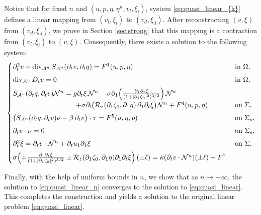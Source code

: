 \documentclass[letterpaper,reqno,10pt,twoside]{amsart}
\theoremstyle{definition}
\theoremstyle{remark}
\def\p{\partial}
\begin{document}
	Notice that for fixed $n$ and $(u,p,\eta,\eta^{n},v_{l},\xi_{l})$, system \eqref{eq:quasi_linear_{k}} defines a linear mapping from $(v_{l},\xi_{l})$ to $(v_{d},\xi_{d})$. After reconstructing $(v,\xi)$ from $(v_{d},\xi_{d})$, we prove in Section \ref{sec:strong} that this mapping is a contraction from $(v_{l},\xi_{l})$ to $(v,\xi)$. Consequently, there exists a solution to the following system:
	\begin{equation}{\label{eq:quasi_linear_n}}
		\begin{cases}
			\partial_{t}^{2}v
			+\operatorname{div}_{\mathcal{A}^{n}}
			S_{\mathcal{A}^{n}}(\partial_{t}v,\partial_{t}q)
			=F^{1}(u,p,\eta)
			& \text{in } \Omega, \\[0.4em]
			\operatorname{div}_{\mathcal{A}^{n}}D_{t}v=0
			& \text{in } \Omega, \\[0.4em]
			S_{\mathcal{A}^{n}}(\partial_{t}q,\partial_{t}v)\mathcal{N}^{n}
			= g\partial_{t}\xi\,\mathcal{N}^{n}
			-\sigma\partial_{1}\!\left(
			\frac{\p_1\p_t\xi}{(1+\vert \partial_{1}\zeta_{0}\vert^{2})^{3/2}}
			\right)\mathcal{N}^{n} \\[0.2em]
			\qquad  \quad\quad\quad\quad\quad\quad\quad
			+\sigma\partial_{1}\!\bigl(
			\mathcal{R}_{z}(\partial_{1}\zeta_{0},\partial_{1}\eta)
			\,\partial_{1}\partial_{t}\xi
			\bigr)\mathcal{N}^{n}
			+F^{4}(u,p,\eta)
			& \text{on } \Sigma, \\[0.4em]
			\bigl(
			S_{\mathcal{A}^{n}}(\partial_{t}q,\partial_{t}v)\nu
			-\beta\,\partial_{t}v
			\bigr)\cdot\tau
			=F^{5}(u,\eta,p)
			& \text{on } \Sigma_{s}, \\[0.4em]
			\partial_{t}v\cdot\nu=0
			& \text{on } \Sigma_{s}, \\[0.4em]
			\partial_{t}^{2}\xi
			=\partial_{t}v\cdot\mathcal{N}^{n}
			+\partial_{t}u_{1}\partial_{1}\xi
			& \text{on } \Sigma, \\[0.4em]
			\sigma\!\left(
			\mp\frac{\partial_{1}\partial_{t}\xi}
			{(1+|\partial_{1}\zeta_{0}|^{2})^{3/2}}
			\pm
			\mathcal{R}_{z}(\partial_{1}\zeta_{0},\partial_{1}\eta)
			\partial_{1}\partial_{t}\xi
			\right)(\pm \ell)
			=\kappa(\partial_{t}v\cdot\mathcal{N}^{n})(\pm \ell)-F^{7}.
		\end{cases}
	\end{equation}
	
	Finally, with the help of uniform bounds in $n$, we show that as $n\to +\infty$, the solution to \eqref{eq:quasi_linear_n} converges to the solution to \eqref{eq:quasi_linear}. This completes the construction and yields a solution to the original linear problem \eqref{eq:quasi_linear}.
	
\end{document}
